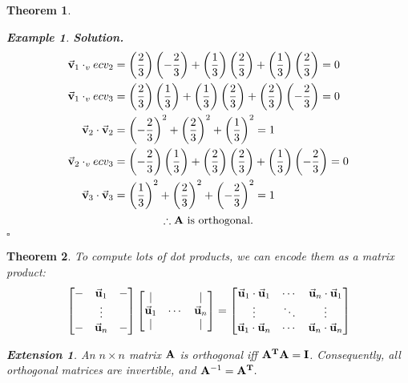 \documentclass[12pt, a4paper]{article}
\newtheorem{thm}{Theorem}[subsection]
\newtheorem{eg}{Example}[subsection]
\newenvironment*{sol}{\par\indent\textbf{\textit{Solution. }}}{\hfill{$\square$}\par}
\newtheorem*{ext}{\indent Extension}
\def\T{{\vb{T}}}
\def\vecv{\va{v}}
\def\vecu{\va{u}}
\def\matrixA{\vb{A}}
\def\matrixI{\vb{I}}
\begin{document}
\begin{thm}
\begin{eg}
\begin{sol}
$$\begin{aligned}
				\vecv_1\cdot_vecv_2&=\left(\frac{2}{3}\right)\left(-\frac{2}{3}\right)+\left(\frac{1}{3}\right)\left(\frac{2}{3}\right)+\left(\frac{1}{3}\right)\left(\frac{2}{3}\right)=0\\
				\vecv_1\cdot_vecv_3&=\left(\frac{2}{3}\right)\left(\frac{1}{3}\right)+\left(\frac{1}{3}\right)\left(\frac{2}{3}\right)+\left(\frac{2}{3}\right)\left(-\frac{2}{3}\right)=0\\
				\vecv_2\cdot\vecv_2&=\left(-\frac{2}{3}\right)^2+\left(\frac{2}{3}\right)^2+\left(\frac{1}{3}\right)^2=1	\\
				\vecv_2\cdot_vecv_3&=\left(-\frac{2}{3}\right)\left(\frac{1}{3}\right)+\left(\frac{2}{3}\right)\left(\frac{2}{3}\right)+\left(\frac{1}{3}\right)\left(-\frac{2}{3}\right)=0\\
				\vecv_3\cdot\vecv_3&=\left(\frac{1}{3}\right)^2+\left(\frac{2}{3}\right)^2+\left(-\frac{2}{3}\right)^2=1	\\
			\end{aligned}$$
			\[\therefore\matrixA\text{ is orthogonal.}\]
		\end{sol}
	\end{eg}
\end{thm}
\begin{thm}
	To compute lots of dot products, we can encode them as a matrix product: 
	\[\begin{bmatrix}-&\vecu_1&-\\&\vdots&\\-&\vecu_n&-\end{bmatrix}\begin{bmatrix}|&&|\\\vecu_1&\cdots&\vecu_n\\|&&|\end{bmatrix}=\begin{bmatrix}\vecu_1\cdot\vecu_1&\cdots&\vecu_n\cdot\vecu_1\\\vdots&\ddots&\vdots\\\vecu_1\cdot\vecu_n&\cdots&\vecu_n\cdot\vecu_n\end{bmatrix}\]
	\begin{ext}
		An $n\times n$ matrix $\matrixA$ is orthogonal \emph{iff} $\matrixA^\T\matrixA=\matrixI$. Consequently, all orthogonal matrices are invertible, and $\matrixA^{-1}=\matrixA^\T.$
	\end{ext}
\end{thm}
\end{document}
